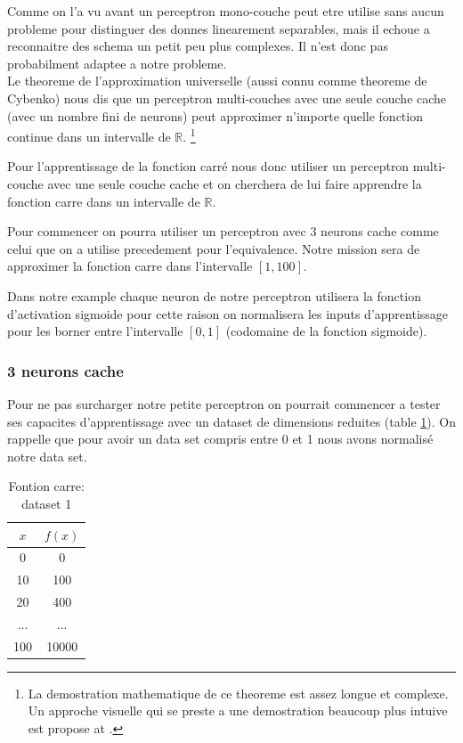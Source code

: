 \documentclass[twoside,openright,a4paper,11pt,french]{article}
\begin{document}
Comme on l'a vu avant un perceptron mono-couche peut etre utilise sans aucun
probleme pour distinguer des donnes linearement separables, mais il echoue 
a reconnaitre des schema un petit peu plus complexes. Il n'est donc pas 
probabilment adaptee a notre probleme.\\

Le theoreme de l'approximation universelle (aussi connu comme theoreme de Cybenko) 
nous dis que un perceptron multi-couches avec une seule couche cache (avec un nombre
fini de neurons) peut approximer n'importe quelle fonction continue dans un 
intervalle de $\mathbb{R}$.
\footnote{
La demostration mathematique de ce theoreme est assez longue et complexe. Un approche visuelle
qui se preste a une demostration beaucoup plus intuive est propose at \cite{visuniprof}.
}
\cite{cybthm}

Pour l'apprentissage de la fonction carré nous donc utiliser un perceptron
multi-couche avec une seule couche cache et on cherchera de lui faire apprendre
la fonction carre dans un intervalle de $\mathbb{R}$.

Pour commencer on pourra utiliser un perceptron avec 3 neurons cache comme
celui que on a utilise precedement pour l'equivalence. Notre mission sera de
approximer la fonction carre dans l'intervalle $[1,100]$.

Dans notre example chaque neuron de notre perceptron utilisera la fonction
d'activation sigmoide pour cette raison on normalisera les inputs
d'apprentissage pour les borner entre l'intervalle $[0,1]$ (codomaine de la
fonction sigmoide).

\subsubsection{3 neurons cache}

Pour ne pas surcharger notre petite perceptron on pourrait commencer a tester
ses capacites d'apprentissage avec un dataset de dimensions reduites (table
\ref{tab:fqt1}). On rappelle que pour avoir un data set compris entre 0 et 1
nous avons normalisé notre data set.

\begin{table}[h]
  \centering
  \begin{tabular}{| c | c |}
    \hline
    \textbf{$x$} & \textbf{$f(x)$}\\
    \hline
    0 & 0 \\
    \hline
    10 & 100 \\
    \hline
    20 & 400 \\
    \hline
    ... & ... \\
    \hline
    100 & 10000 \\
    \hline
  \end{tabular}
  \caption{Fontion carre: dataset 1}
  \label{tab:fqt1}
\end{table}
\end{document}
